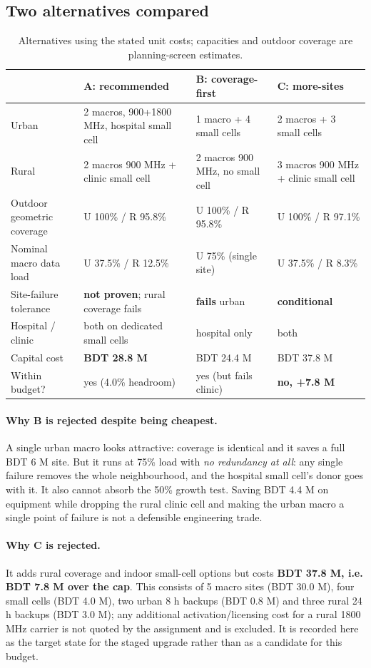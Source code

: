 \documentclass[9pt,a4paper]{extarticle}
\begin{document}
\subsection{Two alternatives compared}
\begin{table}[H]\centering\small
\caption{Alternatives using the stated unit costs; capacities and outdoor coverage are planning-screen estimates.}
\begin{tabularx}{\textwidth}{@{}p{2.9cm}XXX@{}}
\toprule
& \textbf{A: recommended} & \textbf{B: coverage-first} & \textbf{C: more-sites} \\
\midrule
Urban & 2 macros, 900+1800 MHz, hospital small cell & 1 macro + 4 small cells & 2 macros + 3 small cells \\
Rural & 2 macros 900 MHz + clinic small cell & 2 macros 900 MHz, no small cell & 3 macros 900 MHz + clinic small cell \\
Outdoor geometric coverage & U 100\% / R 95.8\% & U 100\% / R 95.8\% & U 100\% / R 97.1\% \\
Nominal macro data load & U 37.5\% / R 12.5\% & U 75\% (single site) & U 37.5\% / R 8.3\% \\
Site-failure tolerance & \textbf{not proven}; rural coverage fails & \textbf{fails} urban & \textbf{conditional} \\
Hospital / clinic & both on dedicated small cells & hospital only & both \\
Capital cost & \textbf{BDT 28.8 M} & BDT 24.4 M & BDT 37.8 M \\
Within budget? & yes (4.0\% headroom) & yes (but fails clinic) & \textbf{no, +7.8 M} \\
\bottomrule
\end{tabularx}
\end{table}

\paragraph{Why B is rejected despite being cheapest.} A single urban macro looks attractive:
coverage is identical and it saves a full BDT 6 M site. But it runs at 75\% load with \emph{no
redundancy at all}: any single failure removes the whole neighbourhood, and the hospital small
cell's donor goes with it. It also cannot absorb the 50\% growth test. Saving BDT 4.4 M on equipment while dropping the rural clinic cell and making the
urban macro a single point of failure is not a defensible engineering trade.

\paragraph{Why C is rejected.} It adds rural coverage and indoor small-cell options but costs
\textbf{BDT 37.8 M, i.e. BDT 7.8 M over the cap}. This consists of 5
macro sites (BDT 30.0 M), four small cells (BDT 4.0 M), two urban 8 h
backups (BDT 0.8 M) and three rural 24 h backups (BDT 3.0 M); any
additional activation/licensing cost for a rural 1800 MHz carrier is not
quoted by the assignment and is excluded. It is recorded
here as the target state for the staged upgrade rather than as a candidate for this budget.
\end{document}
